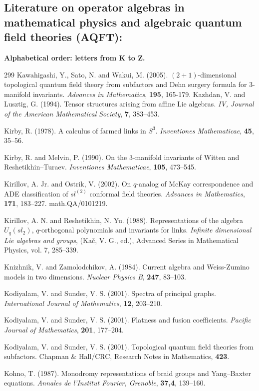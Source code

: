 \documentclass[12pt]{article}
\theoremstyle{plain}
\theoremstyle{definition}
\numberwithin{equation}{section}
\begin{document}
\subsection{Literature on operator algebras in mathematical physics and algebraic quantum field theories (AQFT):}
{\bf Alphabetical order: letters from K to Z.} 
\begin{thebibliography} {299}
Kawahigashi, Y., Sato, N. and Wakui, M. (2005). $(2+1)$-dimensional topological quantum field theory from subfactors
and Dehn surgery formula for $3$-manifold invariants. {\em Advances in Mathematics}, {\bf 195}, 165-179.
Kazhdan, V. and Lusztig, G. (1994).
Tensor structures arising from affine Lie algebras.
{\em IV, Journal of the American Mathematical Society},
{\bf 7}, 383--453.

Kirby, R. (1978).
A calculus of farmed links in $S^3$.
{\em Inventiones Mathematicae}, {\bf 45}, 35--56.

Kirby, R. and Melvin, P. (1990).
On the $3$-manifold invariants of Witten and Reshetikhin--Turaev.
{\em Inventiones Mathematicae}, {\bf 105}, 473--545.

Kirillov, A. Jr. and Ostrik, V. (2002).
On $q$-analog of McKay correspondence and ADE classification of
$sl^{(2)}$ conformal field theories.
{\em Advances in Mathematics}, {\bf 171}, 183--227.
math.QA/0101219.

Kirillov, A. N. and Reshetikhin, N. Yu. (1988).
Representations of the algebra $U_q(sl_2)$,
$q$-orthogonal polynomials and invariants for links.
{\em Infinite dimensional Lie algebras and groups}, (Ka\v c,
V. G., ed.), Advanced Series in Mathematical Physics, vol. 7,
285--339.

Knizhnik, V. and Zamolodchikov, A. (1984).
Current algebra and Weiss-Zumino models in two dimensions.
{\em Nuclear Physics B}, {\bf 247}, 83--103.

Kodiyalam, V. and Sunder, V. S. (2001).
Spectra of principal graphs.
{\em International Journal of Mathematics}, {\bf 12}, 203--210.

Kodiyalam, V. and Sunder, V. S. (2001).
Flatness and fusion coefficients.
{\em Pacific Journal of Mathematics}, {\bf 201}, 177--204.

Kodiyalam, V. and Sunder, V. S. (2001).
Topological quantum field theories from subfactors.
Chapman \& Hall/CRC, Research Notes in Mathematics, {\bf 423}.

Kohno, T. (1987).
Monodromy representations of braid groups and Yang--Baxter
equations.
{\em Annales de l'Institut Fourier, Grenoble},
{\bf 37,4}, 139--160.


\end{thebibliography}
\end{document}
